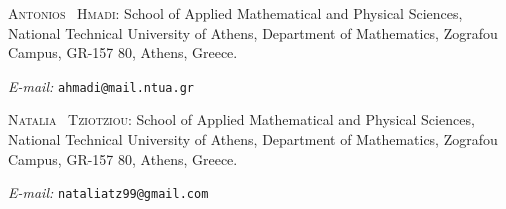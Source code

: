 \documentclass[11pt,leqno]{article}
\theoremstyle{remark}
\numberwithin{equation}{section}
\begin{document}
\bigskip


\noindent \textsc{Antonios \ Hmadi}: School of Applied Mathematical and Physical Sciences, National Technical University of Athens, Department of Mathematics, Zografou Campus, GR-157 80, Athens, Greece.


\smallskip

\noindent \textit{E-mail:} \texttt{ahmadi@mail.ntua.gr}

\bigskip


\noindent \textsc{Natalia \ Tziotziou}: School of Applied Mathematical and Physical Sciences, National Technical University of Athens, Department of Mathematics, Zografou Campus, GR-157 80, Athens, Greece.


\smallskip

\noindent \textit{E-mail:} \texttt{nataliatz99@gmail.com}
\end{document}
